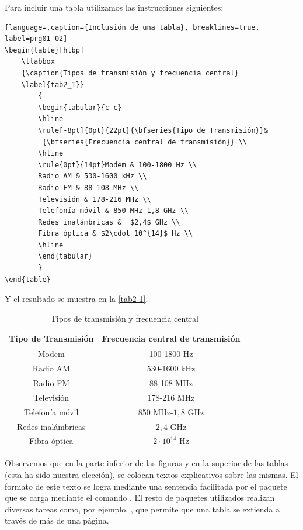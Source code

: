 Para incluir una tabla utilizamos las instrucciones siguientes:
\begin{lstlisting}[language=,caption={Inclusión de una tabla}, breaklines=true, label=prg01-02]
\begin{table}[htbp]
	\ttabbox
	{\caption{Tipos de transmisión y frecuencia central} 
	\label{tab2_1}}
		{
		\begin{tabular}{c c}
		\hline
		\rule[-8pt]{0pt}{22pt}{\bfseries{Tipo de Transmisión}}&
		 {\bfseries{Frecuencia central de transmisión}} \\
		\hline
		\rule{0pt}{14pt}Modem & 100-1800 Hz \\
		Radio AM & 530-1600 kHz \\
		Radio FM & 88-108 MHz \\
		Televisión & 178-216 MHz \\
		Telefonía móvil & 850 MHz-1,8 GHz \\
		Redes inalámbricas &  $2,4$ GHz \\
		Fibra óptica & $2\cdot 10^{14}$ Hz \\
		\hline
		\end{tabular}
		}
\end{table}
\end{lstlisting}

Y el resultado se muestra en la \autoref{tab2-1}.

\begin{table}[htbp]
	\ttabbox
	{\caption{Tipos de transmisión y frecuencia central} \label{tab2-1}}
		{
		\begin{tabular}{c c}
		\hline
		\rule[-8pt]{0pt}{22pt}{\bfseries{Tipo de Transmisión}}& {\bfseries{Frecuencia central de transmisión}} \\
		\hline
		\rule{0pt}{14pt}Modem & 100-1800 Hz \\
		Radio AM & 530-1600 kHz \\
		Radio FM & 88-108 MHz \\
		Televisión & 178-216 MHz \\
		Telefonía móvil & 850 MHz-$1,8$ GHz \\
		Redes inalámbricas &  $2,4$ GHz \\
		Fibra óptica & $2\cdot 10^{14}$ Hz \\
		\hline
		\end{tabular}
		}
\end{table}

Observemos  que en la parte inferior de las figuras y en la superior de las tablas (esta ha sido nuestra elección), se colocan textos explicativos sobre las mismas. El formato de este texto se logra mediante una sentencia facilitada por el paquete que se carga mediante el comando . El resto de paquetes utilizados realizan diversas tareas como, por ejemplo, , que permite que una tabla se extienda a través de más de una página.

